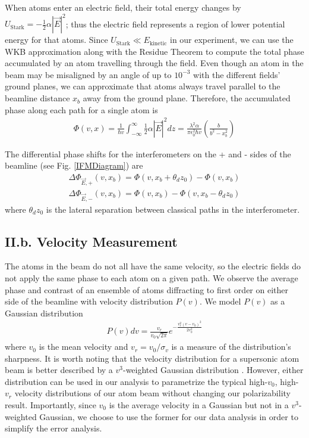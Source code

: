 \documentclass[twocolumn,prl,showpacs,superscriptaddress]{revtex4-1}   %
\newcommand{\figref}[1]{Fig. \ref{#1}}
\begin{document}
When atoms enter an electric field, their total energy changes by $U_{\mathrm{Stark}} = -\frac{1}{2}\alpha|\vec{E}|^2$; thus the electric field represents a region of lower potential energy for that atoms.
Since $U_{\mathrm{Stark}} \ll E_{\mathrm{kinetic}}$ in our experiment, we can use the WKB approximation along with the Residue Theorem to compute the total phase accumulated by an atom travelling through the field.
Even though an atom in the beam may be misaligned by an angle of up to $10^{-3}$ with the different fields' ground planes, we can approximate that atoms always travel parallel to the beamline distance $x_b$ away from the ground plane. Therefore, the accumulated phase along each path for a single atom is
\begin{align}
	\Phi(v,x) = 
	\frac{1}{\hbar v} \int_{-\infty}^{\infty} \frac{1}{2} \alpha |\vec{E}|^2 dz =	
	\frac{\lambda^2 \alpha}{\pi \epsilon_0^2 \hbar v}
	\left( \frac{b}{b^2-x_b^2} \right)
	\label{accumPhasePillars}
\end{align}

The differential phase shifts for the interferometers on the + and - sides of the beamline (see \figref{IFMDiagram}) are
\begin{align}
	\Delta\Phi_{\vec{E},+}(v,x_b) = \Phi(v, x_b+\theta_d z_0) - \Phi(v, x_b) \nonumber \\
	\Delta\Phi_{\vec{E},-}(v,x_b) = \Phi(v, x_b) - \Phi(v, x_b-\theta_d z_0)
	\label{deltaPhasePillars}
\end{align}
where $\theta_d z_0$ is the lateral separation between classical paths in the interferometer. 

\subsection{II.b. Velocity Measurement}

The atoms in the beam do not all have the same velocity, so the electric fields do not apply the same phase to each atom on a given path.
We observe the average phase and contrast of an ensemble of atoms diffracting to first order on either side of the beamline with velocity distribution $P(v)$. 
We model $P(v)$ as a Gaussian distribution
\begin{align}
	P(v)dv = \frac{v_r}{v_0\sqrt{2\pi}}e^{-\frac{v_r^2(v-v_0)^2}{2v_0^2}}
	\label{PvelGaussian}
\end{align}
where $v_0$ is the mean velocity and $v_r = v_0/\sigma_v$ is a measure of the distribution's sharpness. It is worth noting that the velocity distribution for a supersonic atom beam is better described by a $v^3$-weighted Gaussian distribution
\cite{Berman1997}. However, either distribution can be used in our analysis to parametrize the typical high-$v_0$, high-$v_r$ velocity distributions of our atom beam without changing our polarizability result. Importantly, since $v_0$ is the average velocity in a Gaussian but not in a $v^3$-weighted Gaussian, we choose to use the former for our data analysis in order to simplify the error analysis. 
\end{document}
